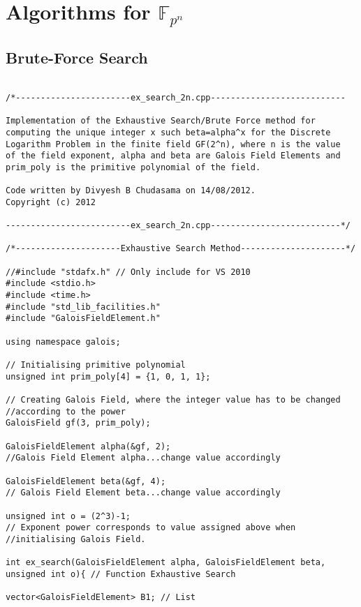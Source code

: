 \documentclass[iwp,first]{luthesis}
\begin{document}
\newpage

\section{Algorithms for $\mathbb{F}_{p^n}$}

\subsection{Brute-Force Search}

\begin{verbatim}

/*-----------------------ex_search_2n.cpp---------------------------

Implementation of the Exhaustive Search/Brute Force method for
computing the unique integer x such beta=alpha^x for the Discrete 
Logarithm Problem in the finite field GF(2^n), where n is the value 
of the field exponent, alpha and beta are Galois Field Elements and 
prim_poly is the primitive polynomial of the field.

Code written by Divyesh B Chudasama on 14/08/2012.
Copyright (c) 2012

-------------------------ex_search_2n.cpp--------------------------*/

/*---------------------Exhaustive Search Method---------------------*/

//#include "stdafx.h" // Only include for VS 2010
#include <stdio.h>
#include <time.h>
#include "std_lib_facilities.h"
#include "GaloisFieldElement.h"

using namespace galois;

// Initialising primitive polynomial
unsigned int prim_poly[4] = {1, 0, 1, 1}; 

// Creating Galois Field, where the integer value has to be changed 
//according to the power
GaloisField gf(3, prim_poly);			 

GaloisFieldElement alpha(&gf, 2); 
//Galois Field Element alpha...change value accordingly 

GaloisFieldElement beta(&gf, 4); 
// Galois Field Element beta...change value accordingly

unsigned int o = (2^3)-1; 
// Exponent power corresponds to value assigned above when 
//initialising Galois Field.

int ex_search(GaloisFieldElement alpha, GaloisFieldElement beta, 
unsigned int o){ // Function Exhaustive Search

vector<GaloisFieldElement> B1; // List


\end{verbatim}
\end{document}
